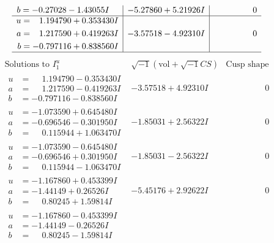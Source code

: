 \documentclass[1p]{elsarticle_modified}
\theoremstyle{definition}
\newcommand{\I}{\sqrt{-1}}
\begin{document}
$$\begin{array}{c|c|c}
\begin{aligned}
b &= -0.27028 - 1.43055 I\end{aligned}
 & -5.27860 + 5.21926 I & \phantom{-0.000000 } 0 \\ \hline\begin{aligned}
u &= \phantom{-}1.194790 + 0.353430 I \\
a &= \phantom{-}1.217590 + 0.419263 I \\
b &= -0.797116 + 0.838560 I\end{aligned}
 & -3.57518 - 4.92310 I & \phantom{-0.000000 } 0\\
 \hline 
 \end{array}$$\newpage$$\begin{array}{c|c|c}  
\text{Solutions to }I^u_{1}& \I (\text{vol} + \sqrt{-1}CS) & \text{Cusp shape}\\
 \hline 
\begin{aligned}
u &= \phantom{-}1.194790 - 0.353430 I \\
a &= \phantom{-}1.217590 - 0.419263 I \\
b &= -0.797116 - 0.838560 I\end{aligned}
 & -3.57518 + 4.92310 I & \phantom{-0.000000 } 0 \\ \hline\begin{aligned}
u &= -1.073590 + 0.645480 I \\
a &= -0.696546 - 0.301950 I \\
b &= \phantom{-}0.115944 + 1.063470 I\end{aligned}
 & -1.85031 + 2.56322 I & \phantom{-0.000000 } 0 \\ \hline\begin{aligned}
u &= -1.073590 - 0.645480 I \\
a &= -0.696546 + 0.301950 I \\
b &= \phantom{-}0.115944 - 1.063470 I\end{aligned}
 & -1.85031 - 2.56322 I & \phantom{-0.000000 } 0 \\ \hline\begin{aligned}
u &= -1.167860 + 0.453399 I \\
a &= -1.44149 + 0.26526 I \\
b &= \phantom{-}0.80245 + 1.59814 I\end{aligned}
 & -5.45176 + 2.92622 I & \phantom{-0.000000 } 0 \\ \hline\begin{aligned}
u &= -1.167860 - 0.453399 I \\
a &= -1.44149 - 0.26526 I \\
b &= \phantom{-}0.80245 - 1.59814 I\end{aligned}

\end{array}$$
\end{document}
